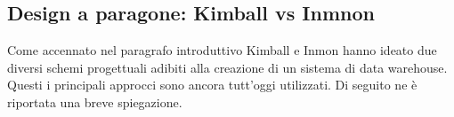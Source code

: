 \subsection{Design a paragone: Kimball vs Inmnon}
Come accennato nel paragrafo introduttivo Kimball e Inmon hanno ideato due diversi schemi progettuali adibiti alla creazione di un sistema di data warehouse. Questi i principali approcci sono ancora tutt’oggi utilizzati. Di seguito ne è riportata una breve spiegazione.\cite{researchgate_data_warehouse_designs}

